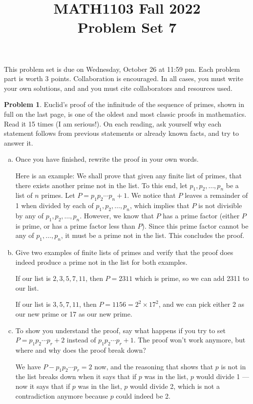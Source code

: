 \documentclass[11pt,oneside]{amsart}
\title{MATH1103 Fall 2022\\
Problem Set 7}
\theoremstyle{definition}
\newtheorem{problem}{Problem}
\theoremstyle{plain}
\begin{document}
    \maketitle
    This problem set is due on Wednesday, October 26 at 11:59 pm. Each problem part is worth 3 points. Collaboration is encouraged. In all cases, you must write your own solutions, and and you must cite collaborators and resources used.

    \begin{problem}
        Euclid's proof of the infinitude of the sequence of primes, shown in full on the last page, is one of the oldest and most classic proofs in mathematics. Read it 15 times (I am serious!). On each reading, ask yourself why each statement follows from previous statements or already known facts, and try to answer it.
        \begin{enumerate}[(a)]
            \item Once you have finished, rewrite the proof in your own words.
            \begin{solution}
                Here is an example: We shall prove that given any finite list of primes, that there exists another prime not in the list. To this end, let $p_1,p_2,\dots,p_n$ be a list of $n$ primes. Let $P=p_1p_2\cdots p_n+1$. We notice that $P$ leaves a remainder of 1 when divided by each of $p_1,p_2,\dots,p_n$, which implies that $P$ is not divisible by any of $p_1,p_2,\dots,p_n$. However, we know that $P$ has a prime factor (either $P$ is prime, or has a prime factor less than $P$). Since this prime factor cannot be any of $p_1,\dots,p_n$, it must be a prime not in the list. This concludes the proof.
            \end{solution}
            \item Give two examples of finite lists of primes and verify that the proof does indeed produce a prime not in the list for both examples.
            \begin{solution}
                If our list is $2,3,5,7,11$, then $P=2311$ which is prime, so we can add 2311 to our list.

                If our list is $3,5,7,11$, then $P=1156=2^2\times 17^2$, and we can pick either 2 as our new prime or 17 as our new prime.
            \end{solution}
            \item To show you understand the proof, say what happens if you try to set $P=p_1p_2\cdots p_r+2$ instead of $p_1p_2\cdots p_r+1$. The proof won't work anymore, but where and why does the proof break down?
            \begin{solution}
                We have $P-p_1p_2\cdots p_r=2$ now, and the reasoning that shows that $p$ is not in the list breaks down when it says that if $p$ was in the list, $p$ would divide 1 --- now it says that if $p$ was in the list, $p$ would divide 2, which is not a contradiction anymore because $p$ could indeed be 2.
            \end{solution}
        \end{enumerate}
    \end{problem}
\end{document}
